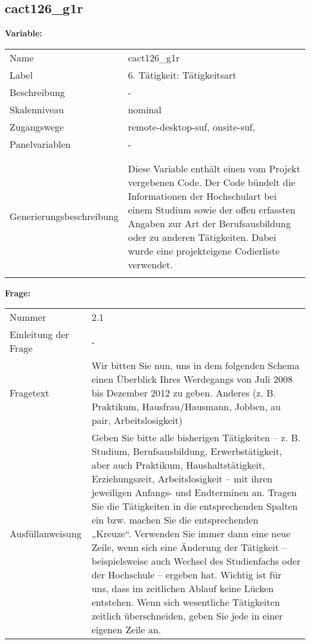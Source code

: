 	
	
	\subsection{cact126\_g1r}
	\label{subSection:cact126_g1r}

	\noindent\textbf{Variable:}\\
		\begin{tabular}{lL{11.3cm}}
			\label{tableVariable:cact126_g1r}
			Name & cact126\_g1r \\
			Label & 6. Tätigkeit: Tätigkeitsart \\
			Beschreibung & - \\
			Skalenniveau & nominal \\
			Zugangswege &
				remote-desktop-suf,
				onsite-suf,
 \\
			Panelvariablen & -
			 \\
			 \\
 \\
					Generierungsbeschreibung & Diese Variable enthält einen vom Projekt vergebenen Code. Der Code bündelt die  Informationen der Hochschulart bei einem Studium sowie der  offen erfassten Angaben zur Art der Berufsausbildung oder zu anderen Tätigkeiten. Dabei wurde eine projekteigene Codierliste verwendet.
				 \\	
			 \\
		\end{tabular}

		\vspace*{1 cm}
		\noindent\textbf{Frage:}\\
		\begin{tabular}{lL{11.3cm}}
			\label{tableQuestion:cact126_g1r}
			Nummer & 2.1 \\
			Einleitung der Frage & - \\
			Fragetext & Wir bitten Sie nun, uns in dem folgenden Schema einen Überblick Ihres Werdegangs von Juli 2008 bis Dezember 2012 zu geben.
Anderes
(z. B. Praktikum, Hausfrau/Hausmann, Jobben, au pair, Arbeitslosigkeit) \\
			Ausfüllanweisung & Geben Sie bitte alle bisherigen Tätigkeiten – z. B. Studium, Berufsausbildung, Erwerbstätigkeit, aber auch Praktikum, Haushaltstätigkeit,
Erziehungszeit, Arbeitslosigkeit – mit ihren jeweiligen Anfangs- und Endterminen an. Tragen Sie die Tätigkeiten in die entsprechenden Spalten ein bzw. machen Sie die entsprechenden „Kreuze“. Verwenden Sie immer dann eine neue Zeile, wenn sich eine Änderung der Tätigkeit – beispielsweise auch Wechsel des Studienfachs oder der Hochschule – ergeben hat. Wichtig ist für uns, dass im zeitlichen Ablauf keine Lücken entstehen. Wenn sich wesentliche Tätigkeiten zeitlich überschneiden, geben Sie jede in einer eigenen Zeile an. \\
		\end{tabular}





